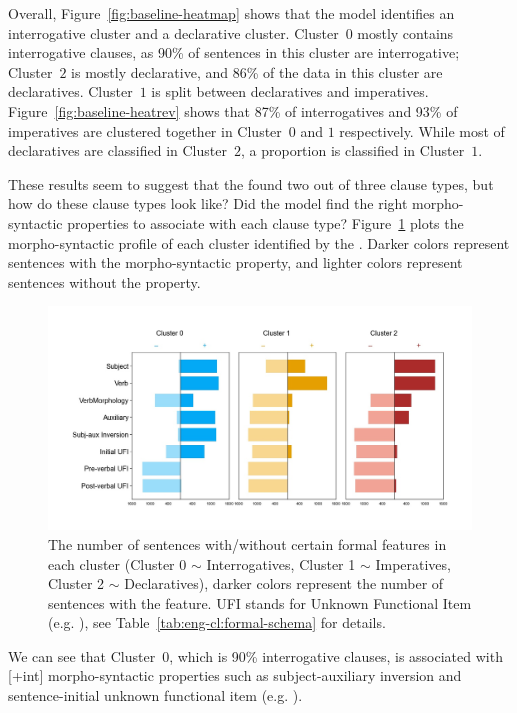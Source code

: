 Overall, Figure~\ref{fig:baseline-heatmap} shows that the \dlearnerabbr{} model identifies an interrogative cluster and a declarative cluster. Cluster~$0$ mostly contains interrogative clauses, as 90\% of sentences in this cluster are interrogative; Cluster~$2$ is mostly declarative, and 86\% of the data in this cluster are declaratives. Cluster~$1$ is split between declaratives and imperatives. Figure~\ref{fig:baseline-heatrev} shows that 87\% of interrogatives and 93\% of imperatives are clustered together in Cluster~$0$ and $1$ respectively. While most of declaratives are classified in Cluster~$2$, a proportion is classified in Cluster~$1$.

These results seem to suggest that the \dlearnerabbr{} found two out of three clause types, but how do these clause types look like? Did the model find the right morpho-syntactic properties to associate with each clause type? Figure~\ref{fig:baseline-syncluster} plots the morpho-syntactic profile of each cluster identified by the \dlearnerabbr{}. Darker colors represent sentences with the morpho-syntactic property, and lighter colors represent sentences without the property. 

\begin{figure}[H]
    \centering
    \includegraphics[width=1\textwidth]{figures/baseline-syncluster.jpg}
    \caption{The number of sentences with/without certain formal features in each cluster (Cluster 0 $\sim$ Interrogatives, Cluster 1 $\sim$ Imperatives, Cluster 2 $\sim$ Declaratives), darker colors represent the number of sentences with the feature. UFI stands for Unknown Functional Item (e.g. \twh{}), see Table~\ref{tab:eng-cl:formal-schema} for details.}
    \label{fig:baseline-syncluster}
\end{figure}

We can see that Cluster~$0$, which is 90\% interrogative clauses, is associated with [+int] morpho-syntactic properties such as subject-auxiliary inversion and sentence-initial unknown functional item (e.g. \twh{}). 

